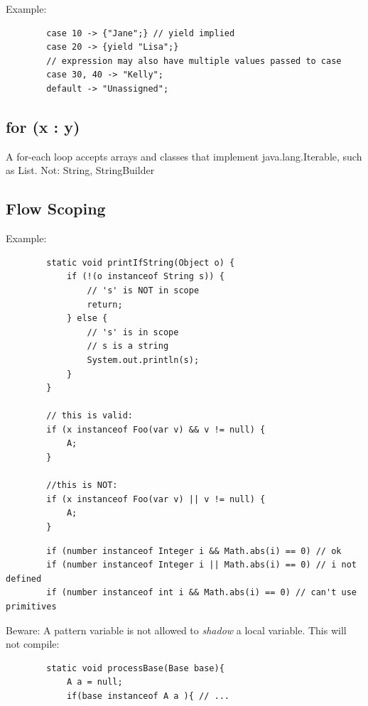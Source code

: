 \documentclass{scrartcl}
\begin{document}
    Example:

    \begin{lstlisting}
        case 10 -> {"Jane";} // yield implied
        case 20 -> {yield "Lisa";}
        // expression may also have multiple values passed to case
        case 30, 40 -> "Kelly";
        default -> "Unassigned";
    \end{lstlisting}

\subsection{ for (x : y)}

     A for-­each loop accepts arrays and classes that implement java.lang.Iterable, such as List. Not: String, StringBuilder

\subsection{Flow Scoping}

    Example:

    \begin{lstlisting}
        static void printIfString(Object o) {
            if (!(o instanceof String s)) {
                // 's' is NOT in scope
                return;
            } else {
                // 's' is in scope
                // s is a string
                System.out.println(s);
            }
        }

        // this is valid:
        if (x instanceof Foo(var v) && v != null) {
            A;
        }

        //this is NOT:
        if (x instanceof Foo(var v) || v != null) {
            A;
        }
    \end{lstlisting}



    \begin{lstlisting}
        if (number instanceof Integer i && Math.abs(i) == 0) // ok
        if (number instanceof Integer i || Math.abs(i) == 0) // i not defined
        if (number instanceof int i && Math.abs(i) == 0) // can't use primitives
    \end{lstlisting}

 Beware: A pattern variable is not allowed to \textit{shadow} a local variable.
 This will not compile:

    \begin{lstlisting}
        static void processBase(Base base){
            A a = null;
            if(base instanceof A a ){ // ...
    \end{lstlisting}
\end{document}
